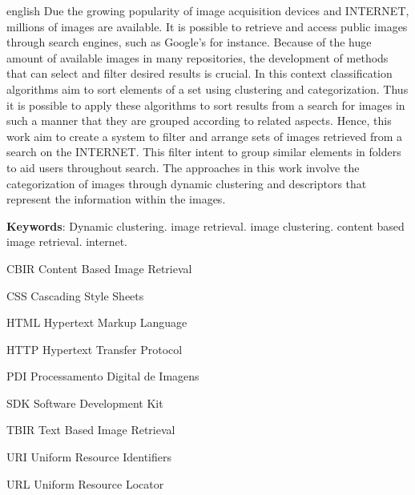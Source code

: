 \documentclass[
	12pt,				%
	openright,			%
	oneside,			%
	a4paper,			%
	english,			%
	brazil				%
	]{abntex2}
\begin{document}
\begin{resumo}[Abstract]
 \begin{otherlanguage*}{english}
 Due the growing popularity of image acquisition devices and INTERNET, millions of images are available. It is possible to retrieve and access public images through search engines, such as Google's for instance. Because of the huge amount of available images in many repositories, the development of methods that can select and filter desired results is crucial. In this context classification algorithms aim to sort elements of a set using clustering and categorization. Thus it is possible to apply these algorithms to sort results from a search for images in such a manner that they are grouped according to related aspects. Hence, this work aim to create a system to filter and arrange sets of images retrieved from a search on the INTERNET. This filter intent to group similar elements in folders to aid users throughout search. The approaches in this work involve the categorization of images through dynamic clustering and descriptors that represent the information within the images.
   
   \textbf{Keywords}: Dynamic clustering. image retrieval. image clustering. content based image retrieval. internet.
 \end{otherlanguage*}
\end{resumo}


\listoffigures*
\cleardoublepage

\listoftables*

\listofalgorithms
\cleardoublepage

\begin{siglas}
	\item[CBIR] Content Based Image Retrieval
	\item[CSS] Cascading Style Sheets
	\item[HTML] Hypertext Markup Language
	\item[HTTP] Hypertext Transfer Protocol
	\item[PDI] Processamento Digital de Imagens
	\item[SDK] Software Development Kit
	\item[TBIR] Text Based Image Retrieval
	\item[URI] Uniform Resource Identifiers
	\item[URL] Uniform Resource Locator  
\end{siglas}
\end{document}

